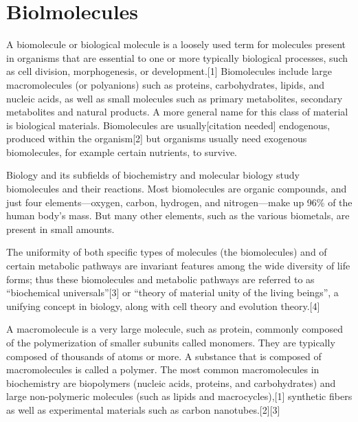 \documentclass[
]{book}
\begin{document}
\hypertarget{biolmolecules}{%
\section{Biolmolecules}\label{biolmolecules}}

A biomolecule or biological molecule is a loosely used term for molecules present in organisms that are essential to one or more typically biological processes, such as cell division, morphogenesis, or development.{[}1{]} Biomolecules include large macromolecules (or polyanions) such as proteins, carbohydrates, lipids, and nucleic acids, as well as small molecules such as primary metabolites, secondary metabolites and natural products. A more general name for this class of material is biological materials. Biomolecules are usually{[}citation needed{]} endogenous, produced within the organism{[}2{]} but organisms usually need exogenous biomolecules, for example certain nutrients, to survive.

Biology and its subfields of biochemistry and molecular biology study biomolecules and their reactions. Most biomolecules are organic compounds, and just four elements---oxygen, carbon, hydrogen, and nitrogen---make up 96\% of the human body's mass. But many other elements, such as the various biometals, are present in small amounts.

The uniformity of both specific types of molecules (the biomolecules) and of certain metabolic pathways are invariant features among the wide diversity of life forms; thus these biomolecules and metabolic pathways are referred to as ``biochemical universals''{[}3{]} or ``theory of material unity of the living beings'', a unifying concept in biology, along with cell theory and evolution theory.{[}4{]}

A macromolecule is a very large molecule, such as protein, commonly composed of the polymerization of smaller subunits called monomers. They are typically composed of thousands of atoms or more. A substance that is composed of macromolecules is called a polymer. The most common macromolecules in biochemistry are biopolymers (nucleic acids, proteins, and carbohydrates) and large non-polymeric molecules (such as lipids and macrocycles),{[}1{]} synthetic fibers as well as experimental materials such as carbon nanotubes.{[}2{]}{[}3{]}
\end{document}
